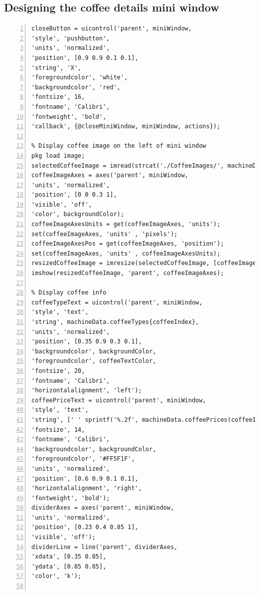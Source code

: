 \documentclass[a4paper, 11pt]{article}
\begin{document}
\subsection{Designing the coffee details mini window}
\begin{lstlisting}[style=Matlab-editor, numbers = left, frame = single]
closeButton = uicontrol('parent', miniWindow, 
'style', 'pushbutton', 
'units', 'normalized', 
'position', [0.9 0.9 0.1 0.1], 
'string', 'X', 
'foregroundcolor', 'white', 
'backgroundcolor', 'red', 
'fontsize', 16, 
'fontname', 'Calibri', 
'fontweight', 'bold', 
'callback', {@closeMiniWindow, miniWindow, actions});

% Display coffee image on the left of mini window
pkg load image;
selectedCoffeeImage = imread(strcat('./CoffeeImages/', machineData.coffeeTypes{coffeeIndex}, '.png'));
coffeeImageAxes = axes('parent', miniWindow, 
'units', 'normalized', 
'position', [0 0 0.3 1], 
'visible', 'off', 
'color', backgroundColor);
coffeeImageAxesUnits = get(coffeeImageAxes, 'units');
set(coffeeImageAxes, 'units' , 'pixels');
coffeeImageAxesPos = get(coffeeImageAxes, 'position');
set(coffeeImageAxes, 'units' , coffeeImageAxesUnits);
resizedCoffeeImage = imresize(selectedCoffeeImage, [coffeeImageAxesPos(4) coffeeImageAxesPos(3)]);
imshow(resizedCoffeeImage, 'parent', coffeeImageAxes);

% Display coffee info
coffeeTypeText = uicontrol('parent', miniWindow, 
'style', 'text', 
'string', machineData.coffeeTypes{coffeeIndex}, 
'units', 'normalized', 
'position', [0.35 0.9 0.3 0.1], 
'backgroundcolor', backgroundColor, 
'foregroundcolor', coffeeTextColor, 
'fontsize', 20, 
'fontname', 'Calibri', 
'horizontalalignment', 'left');
coffeePriceText = uicontrol('parent', miniWindow, 
'style', 'text', 
'string', [' ' sprintf('%.2f', machineData.coffeePrices(coffeeIndex))], 
'fontsize', 14, 
'fontname', 'Calibri',
'backgroundcolor', backgroundColor, 
'foregroundcolor', '#FF5F1F', 
'units', 'normalized', 
'position', [0.6 0.9 0.1 0.1], 
'horizontalalignment', 'right', 
'fontweight', 'bold');
dividerAxes = axes('parent', miniWindow, 
'units', 'normalized', 
'position', [0.23 0.4 0.85 1], 
'visible', 'off');
dividerLine = line('parent', dividerAxes, 
'xdata', [0.35 0.85], 
'ydata', [0.85 0.85], 
'color', 'k');


\end{lstlisting}
\end{document}
